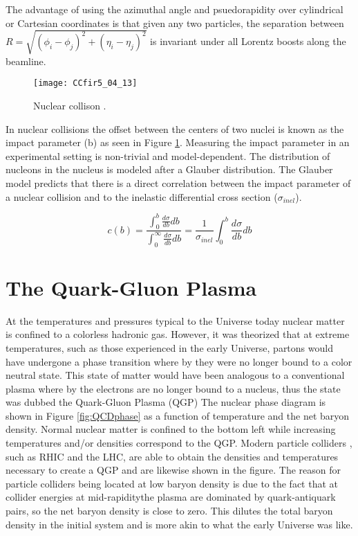 \noindent
The advantage of using the azimuthal angle and psuedorapidity over cylindrical or Cartesian coordinates is that given any two particles, the separation between $R = \sqrt{ (\phi_{i} - \phi_{j})^{2} + (\eta_{i} - \eta_{j})^{2}  } $ is invariant under all Lorentz boosts along the beamline.


\begin{figure}[h]
\texttt{[image: CCfir5\_04\_13]}
\centering
\caption{Nuclear collison  .}
\label{fig:centrality}
\end{figure}

\noindent
In nuclear collisions the offset between the centers of two nuclei is known as the impact parameter (b) as seen in Figure \ref{fig:centrality}.  Measuring the impact parameter in an experimental setting is non-trivial and model-dependent.  The distribution of nucleons in the nucleus is modeled after a Glauber distribution\cite{Loizides:2016djv}.  The Glauber model predicts that there is a direct correlation between the impact parameter of a nuclear collision and to the inelastic differential cross section ($\sigma_{inel}$)\cite{Miller:2007ri}.


\begin{equation}
c(b) =\frac{ \int_{0}^{b} \frac{d \sigma}{db} db}{ \int_{0}^{\infty} \frac{d \sigma}{db} db} = \frac{1}{\sigma_{inel}} \int_{0}^{b} \frac{d \sigma}{db} db
\label{eq:centrality}
\end{equation}

\fi




\section{The Quark-Gluon Plasma}
At the temperatures and pressures typical to the Universe today nuclear matter is confined to a colorless hadronic gas.  However, it was theorized that at extreme temperatures, such as those experienced in the early Universe, partons would have undergone a phase transition where by they were no longer bound to a color neutral state.  This state of matter would have been analogous to a conventional plasma where by the electrons are no longer bound to a nucleus, thus the state was dubbed the Quark-Gluon Plasma (QGP)
The nuclear phase diagram is shown in Figure \ref{fig:QCDphase} as a function of temperature and the net baryon density.  Normal nuclear matter is confined to the bottom left while increasing temperatures and/or densities correspond to the QGP.  Modern particle colliders , such as RHIC and the LHC, are able to obtain the densities and temperatures necessary to create a QGP and are likewise shown in the figure.  The reason for particle colliders being located at low baryon density is due to the fact that at collider energies at mid-rapiditythe plasma are dominated by quark-antiquark pairs, so the net baryon density is close to zero.  This dilutes the total baryon density in the initial system and is more akin to what the early Universe was like.  



